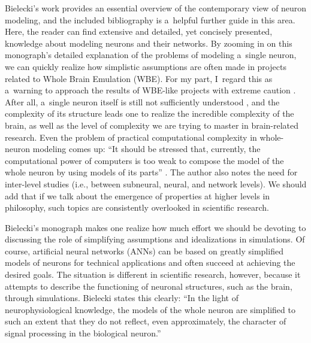 Bielecki's work provides an essential overview of the contemporary view of neuron modeling, and the included bibliography is a~helpful further guide in this area. Here, the reader can find extensive and detailed, yet concisely presented, knowledge about modeling neurons and their networks. By zooming in on this monograph's detailed explanation of the problems of modeling a~single neuron, we can quickly realize how simplistic assumptions are often made in projects related to Whole Brain Emulation (WBE). For my part, I~regard this as a~warning to approach the results of WBE-like projects with extreme caution
\parencite[e.g.][]{kycia_information_2021}. %
 After all, a~single neuron itself is still not sufficiently understood 
\parencite[e.g.][p.133]{bielecki_models_2019}, %
 and the complexity of its structure leads one to realize the incredible complexity of the brain, as well as the level of complexity we are trying to master in brain-related research. Even the problem of practical computational complexity in whole-neuron modeling comes up: ``It should be stressed that, currently, the computational power of computers is too weak to compose the model of the whole neuron by using models of its parts'' 
\parencite[][p.59]{bielecki_models_2019}. %
 The author also notes the need for inter-level studies (i.e., between subneural, neural, and network levels). We should add that if we talk about the emergence of properties at higher levels in philosophy, such topics are consistently overlooked in scientific research.

Bielecki's monograph makes one realize how much effort we should be devoting to discussing the role of simplifying assumptions and idealizations in simulations. Of course, artificial neural networks (ANNs) can be based on greatly simplified models of neurons for technical applications and often succeed at achieving the desired goals. The situation is different in scientific research, however, because it attempts to describe the functioning of neuronal structures, such as the brain, through simulations. Bielecki states this clearly: ``In the light of neurophysiological knowledge, the models of the whole neuron are simplified to such an extent that they do not reflect, even approximately, the character of signal processing in the biological neuron.''
\parencite[][p.57]{bielecki_models_2019}%


